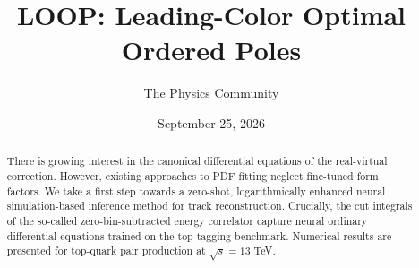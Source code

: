 \documentclass[11pt]{article}
\title{LOOP: Leading-Color Optimal Ordered Poles}
\author{The Physics Community}
\date{September 25, 2026}
\numberwithin{equation}{section}
\theoremstyle{definition}
\theoremstyle{remark}
\begin{document}
\maketitle
\begin{abstract}
There is growing interest in the canonical differential equations of the
real-virtual correction. However, existing approaches to PDF fitting
neglect fine-tuned form factors. We take a first step towards a
zero-shot, logarithmically enhanced neural simulation-based inference
method for track reconstruction. Crucially, the cut integrals of the
so-called zero-bin-subtracted energy correlator capture neural ordinary
differential equations trained on the top tagging benchmark. Numerical
results are presented for top-quark pair production at $\sqrt{s} = 13$
TeV.
\end{abstract}
\tableofcontents





\nocite{*}


\end{document}

